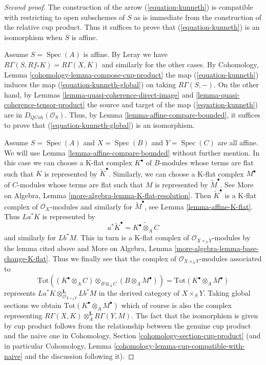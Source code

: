 \documentclass{stacks-project}
\theoremstyle{plain}
\theoremstyle{definition}
\theoremstyle{remark}
\numberwithin{equation}{subsection}
\def\Spec{\mathop{\mathrm{Spec}}}
\def\QCoh{\mathit{QCoh}}
\begin{document}
\begin{proof}[Second proof]
The construction of the arrow (\ref{equation-kunneth}) is compatible
with restricting to open subschemes of $S$ as is immediate from the
construction of the relative cup product. Thus it suffices to prove
that (\ref{equation-kunneth}) is an isomorphism when $S$ is affine.

\medskip\noindent
Assume $S = \Spec(A)$ is affine. By Leray we have
$R\Gamma(S, Rf_*K) = R\Gamma(X, K)$ and similarly for the
other cases. By Cohomology, Lemma \ref{cohomology-lemma-compose-cup-product}
the map (\ref{equation-kunneth}) induces the map
(\ref{equation-kunneth-global}) on taking $R\Gamma(S, -)$.
On the other hand, by
Lemmas \ref{lemma-quasi-coherence-direct-image} and
\ref{lemma-quasi-coherence-tensor-product}
the source and target of the map
(\ref{equation-kunneth}) are in $D_\QCoh(\mathcal{O}_S)$.
Thus, by Lemma \ref{lemma-affine-compare-bounded}, it suffices to prove that
(\ref{equation-kunneth-global}) is an isomorphism.

\medskip\noindent
Assume $S = \Spec(A)$ and $X = \Spec(B)$ and $Y = \Spec(C)$ are all affine.
We will use Lemma \ref{lemma-affine-compare-bounded} without further mention.
In this case we can choose a K-flat complex $K^\bullet$ of $B$-modules
whose terms are flat such that $K$ is represented by $\widetilde{K}^\bullet$.
Similarly, we can choose a K-flat complex $M^\bullet$ of $C$-modules
whose terms are flat such that $M$ is represented by $\widetilde{M}^\bullet$.
See More on Algebra, Lemma \ref{more-algebra-lemma-K-flat-resolution}.
Then $\widetilde{K}^\bullet$ is a K-flat complex of $\mathcal{O}_X$-modules
and similarly for $\widetilde{M}^\bullet$, see
Lemma \ref{lemma-affine-K-flat}. Thus
$La^*K$ is represented by
$$
a^*\widetilde{K}^\bullet = \widetilde{K^\bullet \otimes_A C}
$$
and similarly for $Lb^*M$. This in turn is a K-flat complex
of $\mathcal{O}_{X \times_S Y}$-modules by the lemma cited above
and More on Algebra, Lemma \ref{more-algebra-lemma-base-change-K-flat}.
Thus we finally see that the complex of
$\mathcal{O}_{X \times_S Y}$-modules associated to
$$
\text{Tot}((K^\bullet \otimes_A C) \otimes_{B \otimes_A C}
(B \otimes_A M^\bullet)) =
\text{Tot}(K^\bullet \otimes_A M^\bullet)
$$
represents $La^*K \otimes_{\mathcal{O}_{X \times_S Y}}^\mathbf{L} Lb^*M$
in the derived category of $X \times_S Y$. Taking global sections
we obtain $\text{Tot}(K^\bullet \otimes_A M^\bullet)$ which of course
is also the complex representing
$R\Gamma(X, K) \otimes_A^\mathbf{L} R\Gamma(Y, M)$.
The fact that the isomorphism is given by cup product follows from the
relationship between the genuine cup product and the naive one
in Cohomology, Section \ref{cohomology-section-cup-product}
(and in particular
Cohomology, Lemma \ref{cohomology-lemma-cup-compatible-with-naive}
and the discussion following it).


\end{proof}
\end{document}
